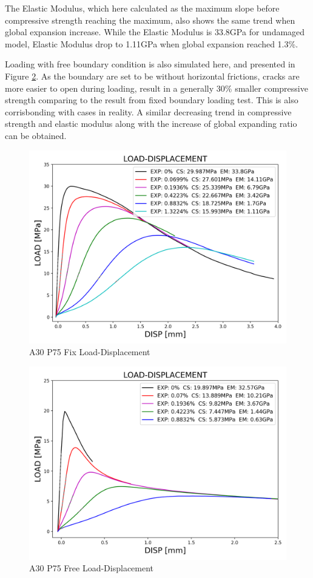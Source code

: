 The Elastic Modulus, which here calculated as the maximum slope before compressive strength reaching the maximum, also shows the same trend when global expansion increase. While the Elastic Modulus is 33.8GPa for undamaged model, Elastic Modulus drop to 1.11GPa when global expansion reached 1.3\%.

Loading with free boundary condition is also simulated here, and presented in Figure \ref{fig:A30P75FREE_LD}. As the boundary are set to be without horizontal frictions, cracks are more easier to open during loading, result in a generally 30\% smaller compressive strength comparing to the result from fixed boundary loading test. This is also corrisbonding with cases in reality. A similar decreasing trend in compressive strength and elastic modulus along with the increase of global expanding ratio can be obtained.


\begin{figure}[ht]
\centering
\includegraphics[width=.8\linewidth]{Files/exp_3D/ASR/S13A30P75FIX-LOAD-DISPLACEMENT.png}
  \caption{A30 P75 Fix Load-Displacement}
  \label{fig:A30P75FIX_LD}
\end{figure}


\begin{figure}[ht!]
\centering
\includegraphics[width=.8\linewidth]{Files/exp_3D/ASR/S13A30P75FREE-LOAD-DISPLACEMENT.png}
  \caption{A30 P75 Free Load-Displacement}
  \label{fig:A30P75FREE_LD}
\end{figure}

